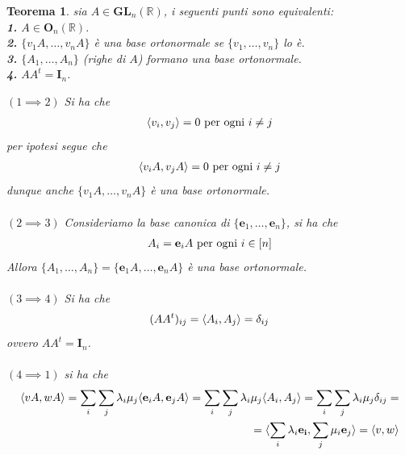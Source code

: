 \documentclass[oneside, 11pt]{amsbook}
\makeatletter
\newcommand{\0}{{(0)}}
\newcommand{\3}{{(3)}}
\theoremstyle{colonplain}
\newtheorem{thm}{Teorema}[chapter]
\theoremstyle{colondefinition}
\theoremstyle{colonremark}
\numberwithin{equation}{chapter}
\renewcommand{\proofname}{Dimostrazione}
\renewenvironment{proof}[1][\proofname]{\par
  \pushQED{\qed}%
  \normalfont \topsep6\p@\@plus6\p@\relax
  \trivlist
  \item[\hskip\labelsep\bfseries #1:]\ignorespaces
}{%
  \popQED\endtrivlist\@endpefalse
}
\makeatother
\begin{document}
\begin{thm} sia $A \in \mathbf{GL}_n(\mathbb{R})$, i seguenti punti sono equivalenti: \\
\textbf{1.} $A \in \mathbf{O}_n(\mathbb{R})$. \\
\textbf{2.} $\{ v_1A, \dots, v_nA \}$ è una base ortonormale se $\{ v_1, \dots, v_n \}$ lo è. \\
\textbf{3.} $\{ A_1, \dots, A_n \}$ (righe di $A$) formano una base ortonormale. \\
\textbf{4.} $AA^t = \mathbf{I}_n$. \\

\begin{proof} $(1 \implies 2)$ Si ha che
\begin{align}
    \langle v_i, v_j \rangle = 0 \text{ per ogni } i \neq j \notag
\end{align}
per ipotesi segue che
\begin{align}
    \langle v_iA, v_jA \rangle = 0 \text{ per ogni } i \neq j \notag
\end{align}
dunque anche $\{ v_1A, \dots, v_nA \}$ è una base ortonormale. \\ \\
$(2 \implies 3)$ Consideriamo la base canonica di $\{ \mathbf{e}_1, \dots, \mathbf{e}_n \}$, si ha che
\begin{align}
    A_i = \mathbf{e}_iA \text{ per ogni } i \in [n] \notag
\end{align}
Allora $\{ A_1, \dots, A_n \} = \{ \mathbf{e}_1A, \dots, \mathbf{e}_nA \}$ è una base ortonormale. \\ \\
$(3 \implies 4)$ Si ha che
\begin{align}
    (AA^t)_{ij} = \langle A_i, A_j \rangle  = \delta_{ij} \notag
\end{align}
ovvero $AA^t = \mathbf{I}_n$. \\ \\
$(4 \implies 1)$ si ha che
\begin{align}
    \langle vA, wA \rangle = \sum_i \sum_j \lambda_i\mu_j \langle \mathbf{e}_iA, \mathbf{e}_jA \rangle = \sum_i \sum_j \lambda_i\mu_j \langle A_i, A_j \rangle = \sum_i\sum_j \lambda_i\mu_j \delta_{ij} = \notag \\
    = \langle \sum_i \lambda_i\mathbf{e_i}, \sum_j \mu_i\mathbf{e}_j \rangle = \langle v, w \rangle \notag
\end{align} \end{proof}
\end{thm}
\end{document}

